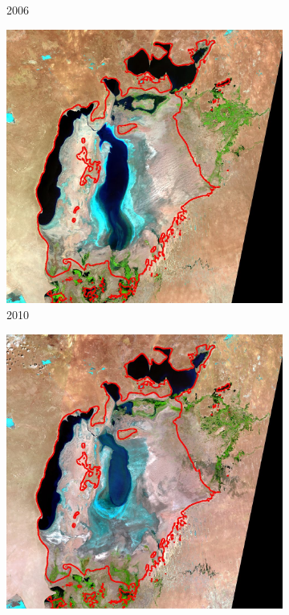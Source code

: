 \documentclass[12pt,a4paper]{article}
\begin{document}
\begin{figure}[H]
\begin{subfigure}[b]{0.19\textwidth}
        \caption{2006}
    \end{subfigure}
    \begin{subfigure}[b]{0.19\textwidth}
        \centering
        \includegraphics[width=\textwidth]{../img/2010o.jpg}
        \caption{2010}
    \end{subfigure}
    \begin{subfigure}[b]{0.19\textwidth}
        \centering
        \includegraphics[width=\textwidth]{../img/2013o.jpg}

\end{subfigure}
\end{figure}
\end{document}
